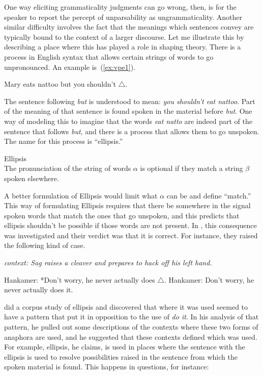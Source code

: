 {One way eliciting grammaticality judgments can go wrong, then, is for the speaker to report the percept of unparsability as ungrammaticality. Another similar difficulty involves the fact that the meanings which sentences convey are typically bound to the context of a larger discourse. Let me illustrate this by describing a place where this has played a role in shaping theory. There is a process in English syntax that allows certain strings of words to go unpronounced. An example is~(\ref{ex:vpe1}).
\begin{exe}
	\raggedright
	\ex \label{ex:vpe1} 
	Mary eats nattoo but you shouldn't $\triangle$.
\end{exe}
The sentence following \emph{but} is understood to mean: \emph{you shouldn't eat nattoo}. Part of the meaning of that sentence is found spoken in the material before \emph{but}. One way of modeling this to imagine that the words \emph{eat natto} are indeed part of the sentence that follows \emph{but}, and there is a process that allows them to go unspoken. The name for this process is ``ellipsis.''
\begin{exe}
	\raggedright
	\ex \label{ex:ell} Ellipsis\\
	The pronunciation of the string of words $\alpha$ is optional if they match a string $\beta$ spoken elsewhere.
\end{exe}
A better formulation of Ellipsis would limit what $\alpha$ can be and define ``match.'' This way of formulating Ellipsis requires that there be somewhere in the signal spoken words that match the ones that go unspoken, and this predicts that ellipsis shouldn't be possible if those words are not present. In \citet{Hankamer:1976}, this consequence was investigated and their verdict was that it is correct. For instance, they raised the following kind of case.
\begin{exe}
	\raggedright
	\ex \label{ex:surface} \emph{context: Sag raises a cleaver and prepares to hack off his left hand.}
	\begin{xlist}
		\ex Hankamer: *Don't worry, he never actually does $\triangle$.
		\ex Hankamer: Don't worry, he never actually does it.
	\end{xlist}
\end{exe}
\citet{Miller:2011} did a corpus study of ellipsis and discovered that where it was used seemed to have a pattern that put it in opposition to the use of \emph{do it}. In his analysis of that pattern, he pulled out some descriptions of the contexts where these two forms of anaphora are used, and he suggested that these contexts defined which was used. For example, ellipsis, he claims, is used in places where the sentence with the ellipsis is used to resolve possibilities raised in the sentence from which the spoken material is found. This happens in questions, for instance:
}
